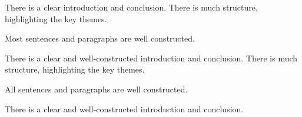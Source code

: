 \documentclass{../fal_assignment}
\begin{document}
\begin{markingrubric}
        \par 		There is a clear introduction and conclusion.
        \grade 		There is much structure, highlighting the key themes.
        \par 		Most sentences and paragraphs are well constructed.
        \par 		There is a clear and well-constructed introduction and conclusion. 
        \grade 		There is much structure, highlighting the key themes.
        \par 		All sentences and paragraphs are well constructed.
        \par 		There is a clear and well-constructed introduction and conclusion.
\end{markingrubric}
\end{document}
